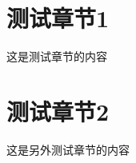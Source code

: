 \documentclass{si_template/cn_note}
\begin{document}
\frontmatter
\mainmatter

\chapter{测试章节1}

这是测试章节的内容

\chapter{测试章节2}

这是另外测试章节的内容

\backmatter
\end{document}
